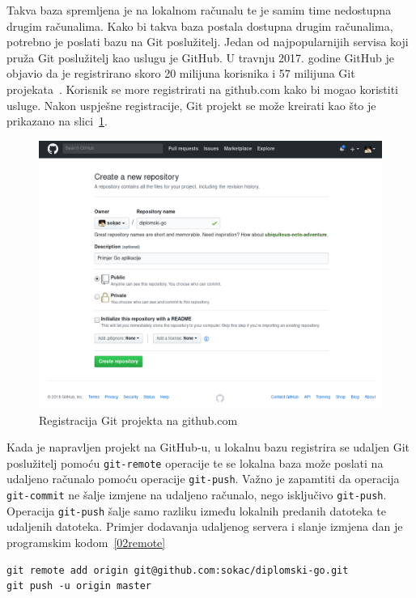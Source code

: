 Takva baza spremljena je na lokalnom računalu te je samim time nedostupna drugim računalima. Kako bi
takva baza postala dostupna drugim računalima, potrebno je poslati bazu na Git poslužitelj. Jedan od
najpopularnijih servisa koji pruža Git poslužitelj kao uslugu je GitHub.  U travnju 2017. godine
GitHub je objavio da je registrirano skoro 20 milijuna korisnika i 57 milijuna Git
projekata~\citep{github2017}. Korisnik se more registrirati na github.com kako bi mogao koristiti
usluge. Nakon uspješne registracije, Git projekt se može kreirati kao što je prikazano na
slici~\ref{fig:02hgreg}.

\begin{figure}[h]
    \centering
    \includegraphics[width=\linewidth]{img/02/gh.png}
    \caption{Registracija Git projekta na github.com}%
    \label{fig:02hgreg}
\end{figure}

Kada je napravljen projekt na GitHub-u, u lokalnu bazu registrira se udaljen Git poslužitelj pomoću
\texttt{git-remote} operacije te se lokalna baza može poslati na udaljeno računalo pomoću operacije
\texttt{git-push}. Važno je zapamtiti da operacija \texttt{git-commit} ne šalje izmjene na udaljeno
računalo, nego isključivo \texttt{git-push}.  Operacija \texttt{git-push} šalje samo razliku između
lokalnih predanih datoteka te udaljenih datoteka.  Primjer dodavanja udaljenog servera i slanje
izmjena dan je programskim kodom~\ref{02remote}

\begin{lstlisting}[float=h]
git remote add origin git@github.com:sokac/diplomski-go.git
git push -u origin master
\end{lstlisting}

